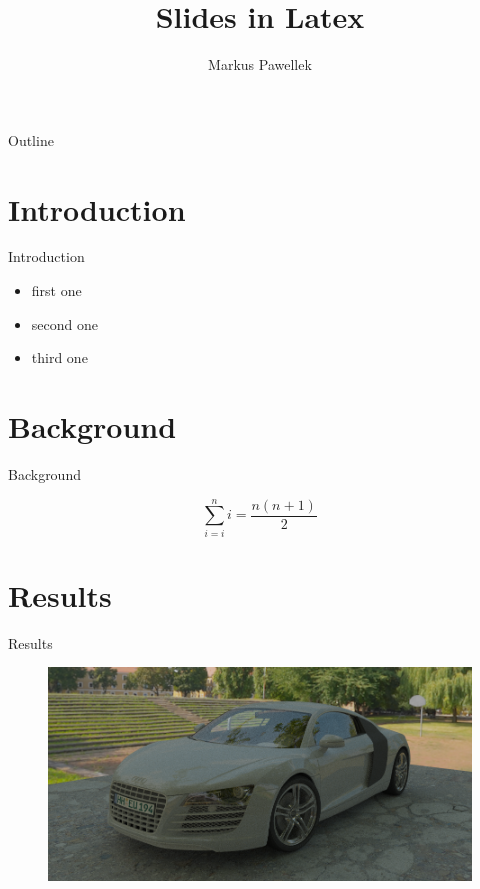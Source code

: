 \documentclass[aspectratio=169]{beamer}
\title{Slides in Latex}
\author{Markus Pawellek}
\begin{document}
  \frame{\titlepage}

  \begin{frame}{Outline}
    \footnotesize
    \hfill\parbox[t][7cm][l]{0.9\textwidth}{\tableofcontents}
  \end{frame}

  \section{Introduction}
    \begin{frame}{Introduction}
      \begin{itemize}
        \item first one
        \pause
        \item second one
        \pause
        \item third one
      \end{itemize}
    \end{frame}

  \section{Background}
    \begin{frame}{Background}
      \begin{mybox}
        \[
          \sum_{i=i}^n i = \frac{n(n+1)}{2}
        \]
      \end{mybox}
    \end{frame}

  \section{Results}
    \begin{frame}{Results}
      \begin{figure}
        \center
        \includegraphics[height=0.7\textheight]{example-audi_r8-pt.png}
      \end{figure}
    \end{frame}
\end{document}
